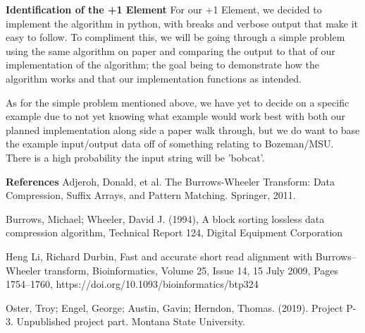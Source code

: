 \documentclass{article}
\begin{document}
    \textbf{Identification of the +1 Element}
    \newline For our +1 Element, we decided to implement the algorithm in python, with breaks and verbose output that make it easy to follow. To compliment this, we will be going through a simple problem using the same algorithm on paper and comparing the output to that of our implementation of the algorithm; the goal being to demonstrate how the algorithm works and that our implementation functions as intended.
    
    As for the simple problem mentioned above, we have yet to decide on a specific example due to not yet knowing what example would work best with both our planned implementation along side a paper walk through, but we do want to base the example input/output data off of something relating to Bozeman/MSU. There is a high probability the input string will be 'bobcat'.
       
   \textbf{References}
   \newline \makebox[.5cm]{[1]} Adjeroh, Donald, et al. The Burrows-Wheeler Transform: Data Compression, Suffix Arrays, and Pattern Matching. Springer, 2011.\par
    \makebox[.5cm]{[2]}  Burrows, Michael; Wheeler, David J. (1994), A block sorting lossless data compression algorithm, Technical Report 124, Digital Equipment Corporation\par
    \makebox[.5cm]{[3]} Heng Li, Richard Durbin, Fast and accurate short read alignment with Burrows–Wheeler transform, Bioinformatics, Volume 25, Issue 14, 15 July 2009, Pages 1754–1760, https://doi.org/10.1093/bioinformatics/btp324\par
    \makebox[.5cm]{[4]} Oster, Troy; Engel, George; Austin, Gavin; Herndon, Thomas. (2019). Project P-3. Unpublished project part. Montana State University.\par
\end{document}
